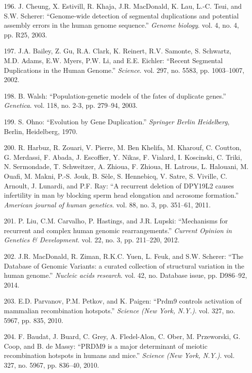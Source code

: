 \documentclass[12pt,a4paper,twoside]{ugathesis}
\theoremstyle{definition}
\theoremstyle{definition}
\theoremstyle{definition}
\theoremstyle{remark}
\begin{document}
\hypertarget{ref-Cheung2003}{}
196. J. Cheung, X. Estivill, R. Khaja, J.R. MacDonald, K. Lau, L.-C.
Tsui, and S.W. Scherer: ``Genome-wide detection of segmental
duplications and potential assembly errors in the human genome
sequence.'' \emph{Genome biology}. vol. 4, no. 4, pp. R25, 2003.

\hypertarget{ref-Bailey2002}{}
197. J.A. Bailey, Z. Gu, R.A. Clark, K. Reinert, R.V. Samonte, S.
Schwartz, M.D. Adams, E.W. Myers, P.W. Li, and E.E. Eichler: ``Recent
Segmental Duplications in the Human Genome.'' \emph{Science}. vol. 297,
no. 5583, pp. 1003--1007, 2002.

\hypertarget{ref-Walsh2003}{}
198. B. Walsh: ``Population-genetic models of the fates of duplicate
genes.'' \emph{Genetica}. vol. 118, no. 2-3, pp. 279--94, 2003.

\hypertarget{ref-Ohno1970}{}
199. S. Ohno: ``Evolution by Gene Duplication.'' \emph{Springer Berlin
Heidelberg}, Berlin, Heidelberg, 1970.

\hypertarget{ref-Harbuz2011a}{}
200. R. Harbuz, R. Zouari, V. Pierre, M. Ben Khelifa, M. Kharouf, C.
Coutton, G. Merdassi, F. Abada, J. Escoffier, Y. Nikas, F. Vialard, I.
Koscinski, C. Triki, N. Sermondade, T. Schweitzer, A. Zhioua, F. Zhioua,
H. Latrous, L. Halouani, M. Ouafi, M. Makni, P.-S. Jouk, B. Sèle, S.
Hennebicq, V. Satre, S. Viville, C. Arnoult, J. Lunardi, and P.F. Ray:
``A recurrent deletion of DPY19L2 causes infertility in man by blocking
sperm head elongation and acrosome formation.'' \emph{American journal
of human genetics}. vol. 88, no. 3, pp. 351--61, 2011.

\hypertarget{ref-Liu2012}{}
201. P. Liu, C.M. Carvalho, P. Hastings, and J.R. Lupski: ``Mechanisms
for recurrent and complex human genomic rearrangements.'' \emph{Current
Opinion in Genetics \& Development}. vol. 22, no. 3, pp. 211--220, 2012.

\hypertarget{ref-MacDonald2014}{}
202. J.R. MacDonald, R. Ziman, R.K.C. Yuen, L. Feuk, and S.W. Scherer:
``The Database of Genomic Variants: a curated collection of structural
variation in the human genome.'' \emph{Nucleic acids research}. vol. 42,
no. Database issue, pp. D986--92, 2014.

\hypertarget{ref-Parvanov2010}{}
203. E.D. Parvanov, P.M. Petkov, and K. Paigen: ``Prdm9 controls
activation of mammalian recombination hotspots.'' \emph{Science (New
York, N.Y.)}. vol. 327, no. 5967, pp. 835, 2010.

\hypertarget{ref-Baudat2010}{}
204. F. Baudat, J. Buard, C. Grey, A. Fledel-Alon, C. Ober, M.
Przeworski, G. Coop, and B. de Massy: ``PRDM9 is a major determinant of
meiotic recombination hotspots in humans and mice.'' \emph{Science (New
York, N.Y.)}. vol. 327, no. 5967, pp. 836--40, 2010.
\end{document}
